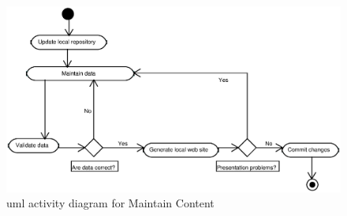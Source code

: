 \documentclass{article}
\begin{document}
\begin{figure}
\includegraphics[scale=0.6]{maintain-content-activity}
\caption{{\sc uml} activity diagram for Maintain Content}
\label{fig:maintain-content-diagram}
\end{figure}
\end{document}
